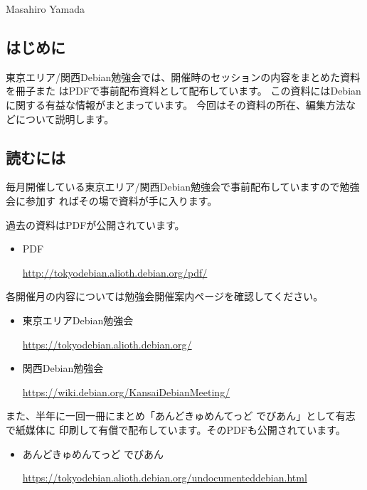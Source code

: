 \documentclass[mingoth,a4paper]{jsarticle}
\begin{document}
\begin{prework}{ Masahiro Yamada }
\end{prework}



\subsection{はじめに}

東京エリア/関西Debian勉強会では、開催時のセッションの内容をまとめた資料を冊子また
はPDFで事前配布資料として配布しています。
この資料にはDebianに関する有益な情報がまとまっています。
今回はその資料の所在、編集方法などについて説明します。

\subsection{読むには}

毎月開催している東京エリア/関西Debian勉強会で事前配布していますので勉強会に参加す
ればその場で資料が手に入ります。

過去の資料はPDFが公開されています。

\begin{itemize}
\item PDF

  \url{http://tokyodebian.alioth.debian.org/pdf/}
\end{itemize}

各開催月の内容については勉強会開催案内ページを確認してください。

\begin{itemize}
\item 東京エリアDebian勉強会

  \url{https://tokyodebian.alioth.debian.org/}
\item 関西Debian勉強会

  \url{https://wiki.debian.org/KansaiDebianMeeting/}
\end{itemize}

また、半年に一回一冊にまとめ「あんどきゅめんてっど でびあん」として有志で紙媒体に
印刷して有償で配布しています。そのPDFも公開されています。

\begin{itemize}
\item あんどきゅめんてっど でびあん

  \url{https://tokyodebian.alioth.debian.org/undocumenteddebian.html}
\end{itemize}
\end{document}
